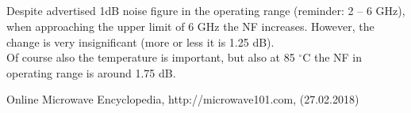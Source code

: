 \documentclass[a4paper, 11pt]{report}
\begin{document}
\subsection*{}
Despite advertised 1dB noise figure in the operating range (reminder: 2 -- 6 GHz), when approaching the upper limit of 6 GHz the NF increases. However, the change is very insignificant (more or less it is 1.25 dB).\\
Of course also the temperature is important, but also at 85 $^\circ$C
the NF in operating range is around 1.75 dB.
\begin{thebibliography}{9}
 Online Microwave Encyclopedia, http://microwave101.com,  (27.02.2018)
\end{thebibliography}
	
\end{document}

